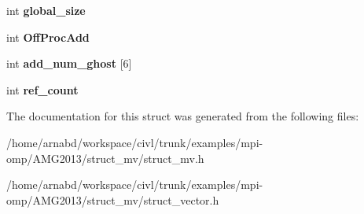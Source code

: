 \begin{DoxyCompactItemize}
\item 
\hypertarget{structhypre__StructVector__struct_ad2e8d1b187f097948cab1241deee108e}{}int {\bfseries global\+\_\+size}\label{structhypre__StructVector__struct_ad2e8d1b187f097948cab1241deee108e}

\item 
\hypertarget{structhypre__StructVector__struct_ac4788747f5c7bb9df256eff2ed6bf887}{}int {\bfseries Off\+Proc\+Add}\label{structhypre__StructVector__struct_ac4788747f5c7bb9df256eff2ed6bf887}

\item 
\hypertarget{structhypre__StructVector__struct_ad6334123e77005ce5c96ff251a5d8a32}{}int {\bfseries add\+\_\+num\+\_\+ghost} \mbox{[}6\mbox{]}\label{structhypre__StructVector__struct_ad6334123e77005ce5c96ff251a5d8a32}

\item 
\hypertarget{structhypre__StructVector__struct_a2492a578c580bec145f69542fe59497a}{}int {\bfseries ref\+\_\+count}\label{structhypre__StructVector__struct_a2492a578c580bec145f69542fe59497a}

\end{DoxyCompactItemize}


The documentation for this struct was generated from the following files\+:\begin{DoxyCompactItemize}
\item 
/home/arnabd/workspace/civl/trunk/examples/mpi-\/omp/\+A\+M\+G2013/struct\+\_\+mv/struct\+\_\+mv.\+h\item 
/home/arnabd/workspace/civl/trunk/examples/mpi-\/omp/\+A\+M\+G2013/struct\+\_\+mv/struct\+\_\+vector.\+h\end{DoxyCompactItemize}
